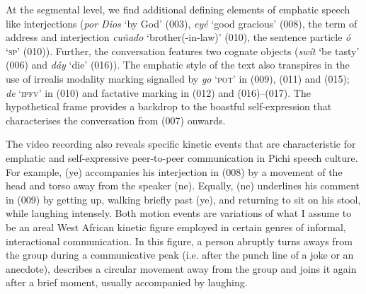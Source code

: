 At the segmental level, we find additional defining elements of emphatic speech like interjections (\textit{por Dios} ‘by God’ (003), \textit{eyé} ‘good gracious’ (008), the term of address and interjection \textit{cuñado} ‘brother(-in-law)’ (010), the sentence particle \textit{ó} ‘\textsc{sp}’ (010)). Further, the conversation features two cognate objects (\textit{swít} ‘be tasty’ (006) and \textit{dáy} ‘die’ (016)). The emphatic style of the text also transpires in the use of irrealis modality marking signalled by \textit{go} ‘\textsc{pot}’ in (009), (011) and (015); \textit{de} ‘\textsc{ipfv}’ in (010) and factative marking in (012) and (016)–(017). The hypothetical frame provides a backdrop to the boastful self-expression that characterises the conversation from (007) onwards. 



The video recording also reveals specific kinetic events that are characteristic for emphatic and self-expressive peer-to-peer communication in Pichi speech culture. For example, (ye) accompanies his interjection in (008) by a movement of the head and torso away from the speaker (ne). Equally, (ne) underlines his comment in (009) by getting up, walking briefly past (ye), and returning to sit on his stool, while laughing intensely. Both motion events are variations of what I assume to be an areal West African kinetic figure employed in certain genres of informal, interactional communication. In this figure, a person abruptly turns aways from the group during a communicative peak (i.e. after the punch line of a joke or an anecdote), describes a circular movement away from the group and joins it again after a brief moment, usually accompanied by laughing.

\setcounter{equation}{0}  %

